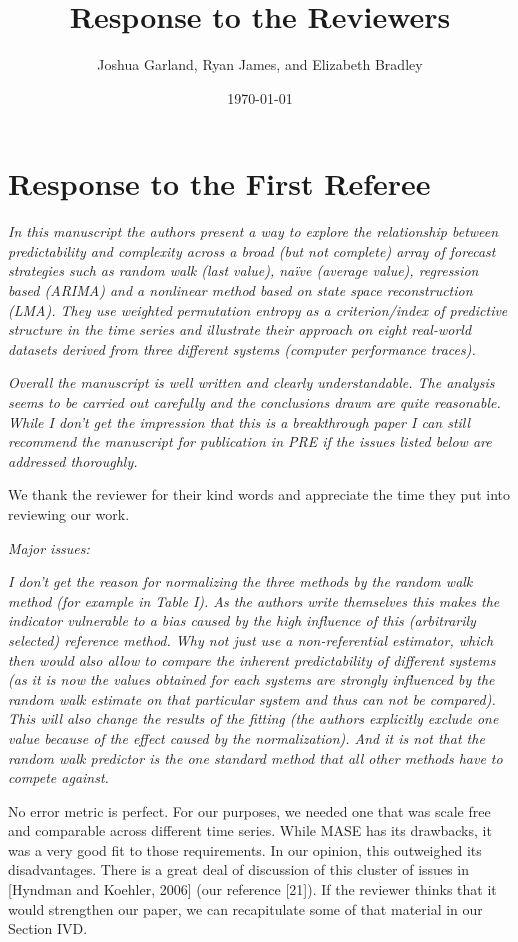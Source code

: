 \documentclass[12pt]{article}
\title{Response to the Reviewers}
\author{Joshua Garland, Ryan James, and Elizabeth Bradley}
\date{\today}
\begin{document}
\maketitle

\section*{Response to the First Referee}

\emph{In this manuscript the authors present a way to explore the
  relationship between predictability and complexity across a broad
  (but not complete) array of forecast strategies such as random walk
  (last value), na\"ive (average value), regression based (ARIMA) and
  a nonlinear method based on state space reconstruction (LMA). They
  use weighted permutation entropy as a criterion/index of predictive
  structure in the time series and illustrate their approach on eight
  real-world datasets derived from three different systems (computer
  performance traces).}

\emph{Overall the manuscript is well written and clearly
  understandable. The analysis seems to be carried out carefully and
  the conclusions drawn are quite reasonable. While I don't get the
  impression that this is a breakthrough paper I can still recommend
  the manuscript for publication in PRE if the issues listed below are
  addressed thoroughly.}

We thank the reviewer for their kind words and appreciate the time
they put into reviewing our work.

\noindent\emph{Major issues:}

\emph{I don't get the reason for normalizing the three methods by the
  random walk method (for example in Table I). As the authors write
  themselves this makes the indicator vulnerable to a bias caused by
  the high influence of this (arbitrarily selected) reference
  method. Why not just use a non-referential estimator, which then
  would also allow to compare the inherent predictability of different
  systems (as it is now the values obtained for each systems are
  strongly influenced by the random walk estimate on that particular
  system and thus can not be compared). This will also change the
  results of the fitting (the authors explicitly exclude one value
  because of the effect caused by the normalization). And it is not
  that the random walk predictor is the one standard method that all
  other methods have to compete against.}

No error metric is perfect.  For our purposes, we needed one that was
scale free and comparable across different time series.  While MASE
has its drawbacks, it was a very good fit to those requirements.  In
our opinion, this outweighed its disadvantages.  There is a great deal
of discussion of this cluster of issues in [Hyndman and Koehler, 2006]
(our reference [21]).  If the reviewer thinks that it would strengthen
our paper, we can recapitulate some of that material in our Section
IVD.
\end{document}
